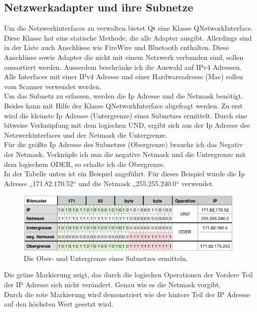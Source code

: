 \documentclass[11pt,a4paper]{article}
\begin{document}
\subsection{Netzwerkadapter und ihre Subnetze}
Um die Netzwerkinterfaces zu verwalten bietet Qt eine Klasse QNetworkInterface. Diese Klasse hat eine statische Methode, die alle Adapter ausgibt. Allerdings sind in der Liste auch Anschlüsse wie FireWire und Bluetooth enthalten. Diese Anschlüsse sowie Adapter die nicht mit einem Netzwerk verbunden sind, sollen aussortiert werden. Ausserdem beschränke ich die Auswahl auf IPv4 Adressen. Alle Interfaces mit einer IPv4 Adresse und einer Hardwareadresse (Mac) sollen vom Scanner verwendet werden.\\
Um das Subnetz zu erfassen, werden die Ip Adresse und die Netmask benötigt. Beides kann mit Hilfe der Klasse QNetworkInterface abgefragt werden.
Zu erst wird die kleinste Ip Adresse (Untergrenze) eines Subnetzes ermittelt. Durch eine bitweise Verknüpfung mit dem logischen UND, ergibt sich aus der Ip Adresse des Netzwerkinterfaces und der Netmask die Untergrenze.\\
Für die größte Ip Adresse des Subnetzes (Obergrenze) brauche ich das Negativ der Netmask. Verknüpfe ich nun die negative Netmask und die Untergrenze mit dem logischem ODER, so erhalte ich die Obergrenze.\\
In der Tabelle unten ist ein Beispiel angeführt. Für dieses Beispiel wurde die Ip Adresse „171.82.170.52“ und die Netmask „255.255.240.0“ verwendet.\\
\begin{figure}[h]
	\centering
	\includegraphics[scale=.8]{Bilder/IpRange.png}
	\caption{Die Ober- und Untergrenze eines Subnetzes ermitteln.}
\end{figure}
Die grüne Markierung zeigt, das durch die logischen Operationen der Vordere Teil der IP Adresse sich nicht verändert. Genau wie es die Netmask vorgibt.\\
Durch die rote Markierung wird demonstriert wie der hintere Teil der IP Adresse auf den höchsten Wert gesetzt wird.\\
\end{document}
